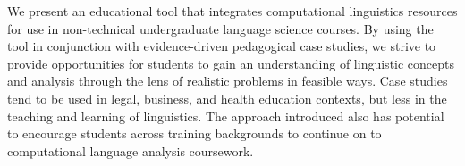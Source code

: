 We present an educational tool that integrates computational linguistics resources for use in non-technical undergraduate language science courses. By using the tool in conjunction with evidence-driven pedagogical case studies, we strive to provide opportunities for students to gain an understanding of linguistic concepts and analysis through the lens of realistic problems in feasible ways. Case studies tend to be used in legal, business, and health education contexts, but less in the teaching and learning of linguistics. The approach introduced also has potential to encourage students across training backgrounds to continue on to computational language analysis coursework.
